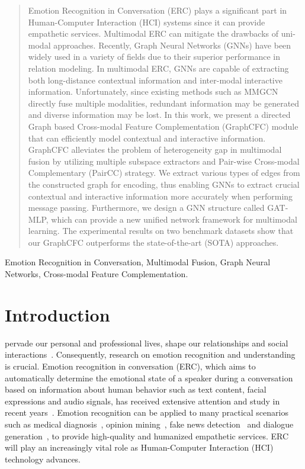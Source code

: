 \documentclass[lettersize,journal]{IEEEtran}
\begin{document}
\begin{abstract}
Emotion Recognition in Conversation (ERC) plays a significant part in Human-Computer Interaction (HCI) systems since it can provide empathetic services. Multimodal ERC can mitigate the drawbacks of uni-modal approaches. Recently, Graph Neural Networks (GNNs) have been widely used in a variety of fields due to their superior performance in relation modeling. In multimodal ERC, GNNs are capable of extracting both long-distance contextual information and inter-modal interactive information. Unfortunately, since existing methods such as MMGCN directly fuse multiple modalities, redundant information may be generated and diverse information may be lost. In this work, we present a directed Graph based Cross-modal Feature Complementation (GraphCFC) module that can efficiently model contextual and interactive information. GraphCFC alleviates the problem of heterogeneity gap in multimodal fusion by utilizing multiple subspace extractors and Pair-wise Cross-modal Complementary (PairCC) strategy. We extract various types of edges from the constructed graph for encoding, thus enabling GNNs to extract crucial contextual and interactive information more accurately when performing message passing. Furthermore, we design a GNN structure called GAT-MLP, which can provide a new unified network framework for multimodal learning. The experimental results on two benchmark datasets show that our GraphCFC outperforms the state-of-the-art (SOTA) approaches.
\end{abstract}

\begin{IEEEkeywords}
Emotion Recognition in Conversation, Multimodal Fusion, Graph Neural Networks, Cross-modal Feature Complementation.
\end{IEEEkeywords}

\section{Introduction}
 pervade our personal and professional lives, shape our relationships and social interactions~\cite{van2022social}. Consequently, research on emotion recognition and understanding is crucial. Emotion recognition in conversation (ERC), which aims to automatically determine the emotional state of a speaker during a conversation based on information about human behavior such as text content, facial expressions and audio signals, has received extensive attention and study in recent years~\cite{ghosal2019dialoguegcn,majumder2019dialoguernn,hu2021dialoguecrn,hu2021mmgcn}. Emotion recognition can be applied to many practical scenarios such as medical diagnosis~\cite{huang2019speech}, opinion mining~\cite{chatterjee2019semeval}, fake news detection~\cite{zhang2021mining} and dialogue generation~\cite{huang2018automatic}, to provide high-quality and humanized empathetic services. ERC will play an increasingly vital role as Human-Computer Interaction (HCI) technology advances.
\end{document}
